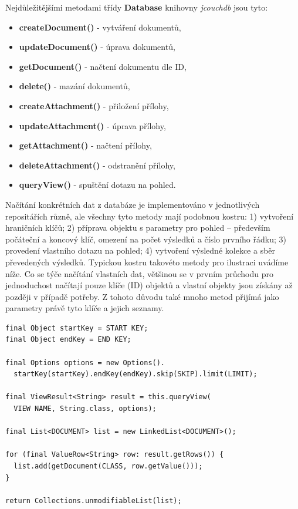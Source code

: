 Nejdůležitějšími metodami třídy {\bf Database} knihovny {\em jcouchdb} jsou tyto:

\begin{itemize}
\item{{\bf createDocument()} - vytváření dokumentů,}
\item{{\bf updateDocument()} - úprava dokumentů,}
\item{{\bf getDocument()} - načtení dokumentu dle ID,}
\item{{\bf delete()} - mazání dokumentů,}
\item{{\bf createAttachment()} - přiložení přílohy,}
\item{{\bf updateAttachment()} - úprava přílohy,}
\item{{\bf getAttachment()} - načtení přílohy,}
\item{{\bf deleteAttachment()} - odstranění přílohy,}
\item{{\bf queryView()} - spuštění dotazu na pohled.}
\end{itemize}

Načítání konkrétních dat z databáze je implementováno v jednotlivých repositářích různě, ale všechny tyto metody mají podobnou kostru: 1) vytvoření hraničních klíčů; 2) příprava objektu s parametry pro pohled -- především počáteční a koncový klíč, omezení na počet výsledků a číslo prvního řádku; 3) provedení vlastního dotazu na pohled; 4) vytvoření výsledné kolekce a sběr převedených výsledků. Typickou kostru takovéto metody pro ilustraci uvádíme níže. Co se týče načítání vlastních dat, většinou se v prvním průchodu pro jednoduchost načítají pouze klíče (ID) objektů a vlastní objekty jsou získány až později v případě potřeby. Z tohoto důvodu také mnoho metod přijímá jako parametry právě tyto klíče a jejich seznamy.

\begin{verbatim}
final Object startKey = START KEY;
final Object endKey = END KEY;
        
final Options options = new Options().
  startKey(startKey).endKey(endKey).skip(SKIP).limit(LIMIT);
        
final ViewResult<String> result = this.queryView(
  VIEW NAME, String.class, options);
 
final List<DOCUMENT> list = new LinkedList<DOCUMENT>();
  
for (final ValueRow<String> row: result.getRows()) {
  list.add(getDocument(CLASS, row.getValue()));
}

return Collections.unmodifiableList(list);
\end{verbatim}

